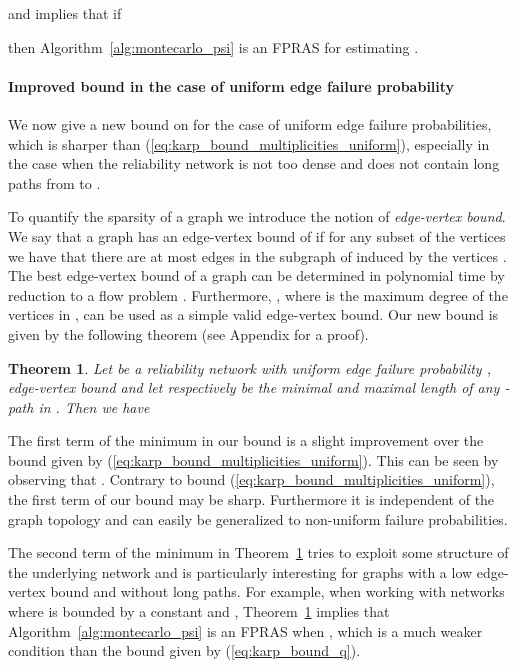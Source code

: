\documentclass{article}
\newtheorem{theorem}{Theorem}
\begin{document}
and implies that if

then Algorithm~\ref{alg:montecarlo_psi} is an FPRAS for
estimating .

\paragraph{Improved bound in the case
  of uniform edge failure probability}\label{sec:bound}

We now give a new bound on
 for the case of uniform edge failure probabilities,
which is sharper than (\ref{eq:karp_bound_multiplicities_uniform}),
especially in the case when the reliability network  is
not too dense and does not contain long paths from 
to .

To quantify the sparsity
of a graph we introduce the notion of \textit{\mbox{edge-vertex} bound}.
We say that a graph 
has an \mbox{edge-vertex} bound of  if for any subset of the
vertices  we have that there are at most  edges in the subgraph of  induced by the vertices
. The best \mbox{edge-vertex} bound of a graph can be determined
in polynomial time by reduction to a flow problem \cite{gallo_1989_fast}. Furthermore,
, where  is the maximum degree of the
vertices in , can be used as a simple valid \mbox{edge-vertex} bound.
Our new bound is given by the following theorem (see Appendix for a proof).

\begin{theorem}\label{thm:improved_bound}
Let  be a reliability network with
uniform edge failure probability ,
\mbox{edge-vertex} bound  and let  respectively  be the minimal and maximal length
of any - path in . Then we
have

\end{theorem}

The first term of the minimum in our bound is a
slight improvement over the bound given by
(\ref{eq:karp_bound_multiplicities_uniform}). This can be
seen by observing that . Contrary to bound
(\ref{eq:karp_bound_multiplicities_uniform}), the first term
of our bound may
be sharp. Furthermore it is independent of the graph topology and can easily
be generalized to \mbox{non-uniform} failure probabilities.

The second term of the minimum in
Theorem~\ref{thm:improved_bound} tries to exploit some
structure of the underlying network and is particularly interesting
for graphs with a low \mbox{edge-vertex} bound  and without
long paths. For example, when working with networks where  is bounded
by a constant and ,
Theorem~\ref{thm:improved_bound} implies that
Algorithm~\ref{alg:montecarlo_psi} is an FPRAS when
,
which is a much weaker condition than the bound given by (\ref{eq:karp_bound_q}).
\end{document}
